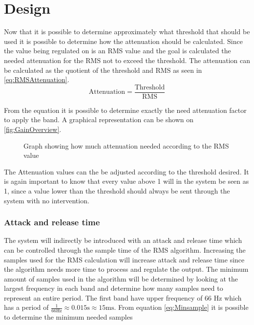 \section{Design}
Now that it is possible to determine approximately what threshold that should be used it is possible to determine how the attenuation should be calculated. Since the value being regulated on is an RMS value and the goal is calculated the needed attenuation for the RMS not to exceed the threshold. The attenuation can be calculated as the quotient of the threshold and RMS as seen in \autoref{eq:RMSAttenuation}.
\begin{equation}\label{eq:RMSAttenuation}
\text{Attenuation} = \frac{\text{Threshold}}{\text{RMS}}
\end{equation}

From the equation it is possible to determine exactly the need attenuation factor to apply the band. A graphical representation can be shown on \autoref{fig:GainOverview}.

\begin{figure}[H]
\centering
{}

\caption{Graph showing how much attenuation needed according to the RMS value}
\label{fig:GainOverview}
\end{figure}

The Attenuation values can the be adjusted according to the threshold desired. It is again important to know that every value above 1 will in the system be seen as 1, since a value lower than the threshold should always be sent through the system with no intervention.  


\subsubsection{Attack and release time}
The system will indirectly be introduced with an attack and release time which can be controlled through the sample time of the RMS algorithm. Increasing the samples used for the RMS calculation will increase attack and release time since the algorithm needs more time to process and regulate the output. The minimum amount of samples used in the algorithm will be determined by looking at the largest frequency in each band and determine how many samples need to represent an entire period. The first band have upper frequency of 66 Hz which has a period of $\frac{1}{66 \text{Hz}} \approx 0.015 \text{s} \approx 15 \text{ms}$. From equation \ref{eq:Minsample} it is possible to determine the minimum needed samples

